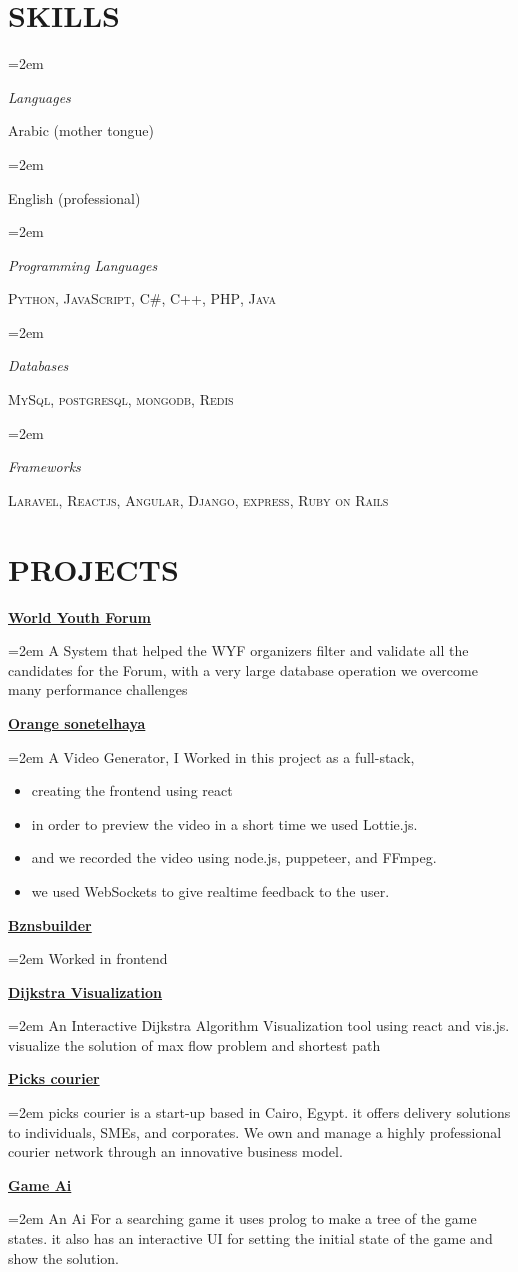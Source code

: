 \documentclass[paper=a4,fontsize=11pt]{scrartcl} %
\newlength{\spacebox}
\newcommand{\sepspace}{\vspace*{1em}}		%
\newcommand{\NewPart}[1]{\section*{\uppercase{#1}}}
\newcommand{\PersonalEntry}[2]{
		\noindent\hangindent=1em\hangafter=0 %
		\parbox{\spacebox}{        %
		\textit{#1}}		       %
		\hspace{1.5em} #2 \par}    %
\newcommand{\SkillsEntry}[2]{      %
		\noindent\hangindent=2em\hangafter=0 %
		\parbox{\spacebox}{        %
		\textit{#1}}			   %
		\hspace{1.5em} #2 \par}    %
\newcommand{\ProjectEntry}[2]{
		\noindent \textbf{#1} \hfill      %
		
		\noindent\hangindent=2em\hangafter=0 \small #2 %
		\normalsize 
		\sepspace
		}
\begin{document}
\NewPart{Skills}{
\SkillsEntry{Languages}{Arabic (mother tongue)}
\SkillsEntry{}{English (professional)}

\sepspace
\SkillsEntry{Programming Languages}{\textsc{Python}, \textsc{JavaScript},  \textsc{C\#}, \textsc{C++},  \textsc{PHP}, \textsc{Java}}
\sepspace


\SkillsEntry{Databases}{\textsc{MySql}, \textsc{postgresql}, \textsc{mongodb}, \textsc{Redis}}

\sepspace


\SkillsEntry{Frameworks}{\textsc{Laravel}, \textsc{Reactjs}, \textsc{Angular}, \textsc{Django}, \textsc{express}, \textsc{Ruby on Rails}}

}

\NewPart{projects}{
\ProjectEntry{\href{https://wyfegypt.com/}{World Youth Forum}}{A System that helped the WYF organizers filter and validate all the candidates for the Forum, with a very large database operation we overcome many performance challenges}

\ProjectEntry{\href{https://orange-sonetelhaya.com/}{Orange sonetelhaya}}{A Video Generator, I Worked in this project as a full-stack, 
\begin{itemize}
 \item creating the frontend using react
 \item in order to preview the video in a short time we used Lottie.js.
 \item and we recorded the video using node.js, puppeteer, and FFmpeg.
 \item we used WebSockets to give realtime feedback to the user.
\end{itemize}
}

\ProjectEntry{\href{https://bznsbuilder.com/}{Bznsbuilder}}{Worked in frontend}


\ProjectEntry{\href{https://react-dijkstra.now.sh}{Dijkstra Visualization}}{
An Interactive Dijkstra Algorithm Visualization tool using react and vis.js. visualize the solution of max flow problem and shortest path
}

\ProjectEntry{\href{http://pickscourier.com}{Picks courier}}{
picks courier is a start-up based in Cairo, Egypt. it offers delivery solutions to individuals, SMEs, and corporates. We own and manage a highly professional courier network through an innovative business model.}


\ProjectEntry{\href{https://github.com/peter44322/p5js-search}{Game Ai}}{An Ai For a searching game it uses prolog to make a tree of the game states. it also has an interactive UI for setting the initial state of the game and show the solution.}

}
\end{document}
